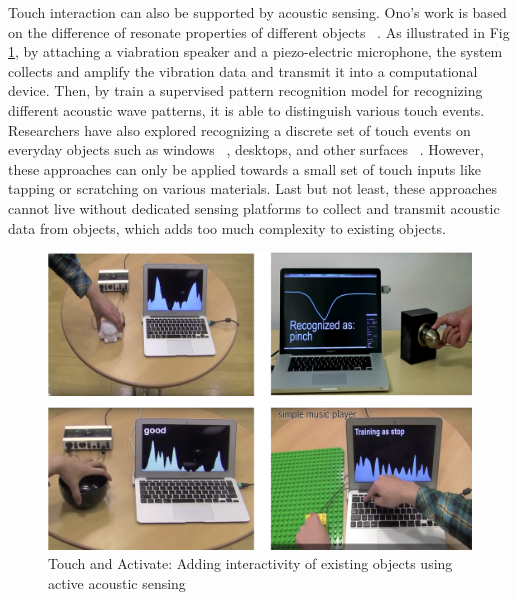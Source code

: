 Touch interaction can also be supported by acoustic sensing.  Ono's work is based on the difference of resonate properties of different objects ~\cite{Ono-Touch-and-Activate}. As illustrated in Fig \ref{fig:acoustic-sensing}, by attaching a viabration speaker and a piezo-electric microphone, the system collects and amplify the vibration data and transmit it into a computational device. Then, by train a supervised pattern recognition model for recognizing different acoustic wave patterns, it is able to distinguish various touch events. Researchers have also explored recognizing a discrete set of touch events on everyday objects such as windows ~\cite{Paradiso-2002-Window}, desktops, and other surfaces ~\cite{Harrison-2008-Scratch-iput}. However, these approaches can only be applied towards a small set of touch inputs like tapping or scratching on various materials. Last but not least, these approaches cannot live without dedicated sensing platforms to collect and transmit acoustic data from objects, which adds too much complexity to existing objects.

\begin{figure}[ht]
    \centering
	\includegraphics[width=0.88\columnwidth]{figures/acoustic-sensing.png}
	\setlength{\belowcaptionskip}{-6pt}
    \caption{Touch and Activate: Adding interactivity of existing objects using active acoustic sensing}
    \label{fig:acoustic-sensing}
\end{figure}

